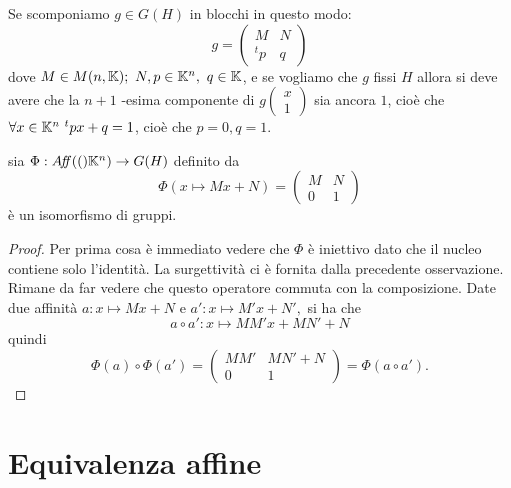 \documentclass[a4paper,12pt]{article}
\newcommand{\Got}[1]{#1}
\newcommand{\got}[1]{{#1}}
\begin{document}
 \begin{remark}
 \Got{Se scomponiamo } $\got{g\in G(H)}$ \Got{in blocchi in questo modo:}
 \[
	\got{g} = \left(
		\begin{array}{cc}
		\got{M} & \got{N} \\ 
		\got{^tp} & \got{q}
		\end{array}
	\right)
 \]
 \Got{ dove} $\got{M\in M(n,\K);\  N,p\in \K^n,\ q \in \K}$, \Got{e se vogliamo che } $\got{g}$ \Got{fissi} $\got{H}$
 \Got{allora si deve avere che la} $\got{n+1}$ \Got{-esima componente di} $\got{g\left( \begin{matrix}
                                                              x\\
                                                              \hline
                                                              1
                                                             \end{matrix} \right)}$ \Got{sia ancora} $\got{1}$,
 \Got{cioè che } $\got{\forall x\in \K^n\  ^tpx+q=1}$, \Got{cioè che} $\got{p=0, q=1}$.
 \end{remark}
 
 \begin{proposition}
 \Got{sia } $\Phi:\got{\Aff(\K^n)\rightarrow G(H)}$ \Got{definito da}
 \[
	\Phi\got{(x\mapsto Mx+N)=}\left(
		\begin{array}{cc}
		\got{M} & \got{N} \\ 
		\got{0} & \got{1}
		\end{array}
	\right)
 \]
 \Got{è un isomorfismo di gruppi.}
 \end{proposition}
 
 \begin{proof}
 \Got{Per prima cosa è immediato vedere che} $\Phi$ \Got{ è iniettivo dato che il nucleo contiene solo l'identità.}
 \Got{La surgettività ci è fornita dalla precedente osservazione. Rimane da far vedere che questo operatore commuta con la composizione.}
 \Got{Date due affinità} $\got{a:x\mapsto Mx+N}$ \Got{e} $\got{a':x\mapsto M'x+N',}$ \Got{si ha che}
 \[
	\got{a\circ a':x\mapsto MM'x+ MN'+N}
 \]
 \Got{quindi}
 \[
	\Phi\got{(a)}\circ\Phi\got{(a')}=\left(
		\begin{array}{cc}
		\got{MM'} & \got{MN'+N} \\ 
		\got{0} & \got{1}
		\end{array}
	\right)=\Phi\got{(a\circ a')}.
 \]
 \end{proof}
 
	\section{Equivalenza affine}
\end{document}
